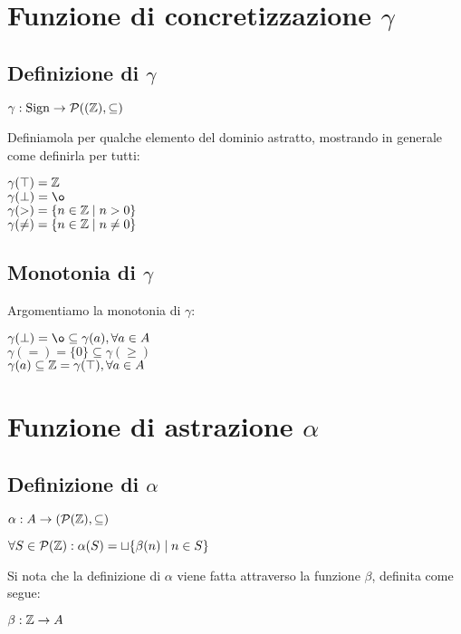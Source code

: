 \newpage

\section{Funzione di concretizzazione $\gamma$}

\subsection{Definizione di $\gamma$}
\begin{center}
	$ \gamma : \mathrm{Sign} \rightarrow \mathcal{P}({(\mathbb{Z}), \subseteq)} $
\end{center}

Definiamola per qualche elemento del dominio astratto, mostrando in generale come definirla per tutti:
\begin{center}
	$ \gamma(\top) = \mathbb{Z} $ \\
	$ \gamma(\bot) = \o $ \\
	$ \gamma(>) = \{ n \in \mathbb{Z} \mid n > 0 \} $ \\
	$ \gamma(\neq) = \{ n \in \mathbb{Z} \mid n \neq 0 \} $
\end{center}

\subsection{Monotonia di $\gamma$}
Argomentiamo la monotonia di $\gamma$:
\begin{center}
	$ \gamma(\bot) = \o \subseteq \gamma(a) , \forall a \in A $ \\
	$ \gamma(=) = \{0\} \subseteq \gamma(\geq) $ \\
	$ \gamma(a) \subseteq \mathbb{Z} = \gamma(\top), \forall a \in A $
\end{center}

\section{Funzione di astrazione $\alpha$}

\subsection{Definizione di $\alpha$}
\begin{center}
	$ \alpha : A \rightarrow (\mathcal{P}{(\mathbb{Z}), \subseteq)} $
\end{center}
\begin{center}
	$ \forall S \in \mathcal{P}(\mathbb{Z}) : \alpha(S) = \sqcup \{ \beta(n) \mid n \in S \} $
\end{center}
Si nota che la definizione di $\alpha$ viene fatta attraverso la funzione $\beta$, definita come segue:
\begin{center}
	$ \beta: \mathbb{Z} \rightarrow A  $
\end{center}

